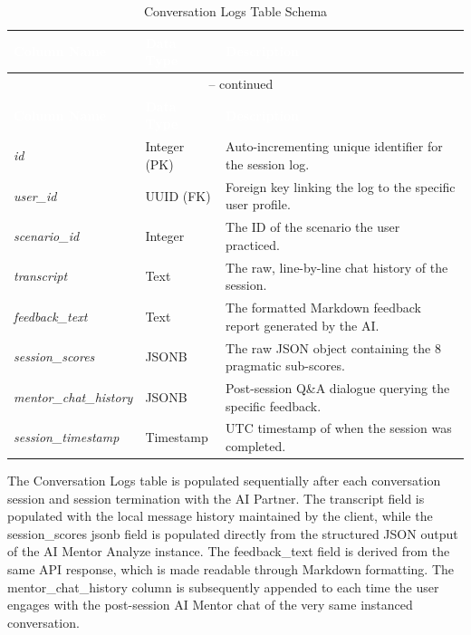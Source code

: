 \begin{longtable}{p{3.5cm} p{2.5cm} p{8cm}}
\caption{Conversation Logs Table Schema}
\label{tab:conversation_logs} \\

\rowcolor{headerblue}
\textcolor{white}{\textbf{Column Name}} &
\textcolor{white}{\textbf{Data Type}} &
\textcolor{white}{\textbf{Description}} \\
\endfirsthead
\multicolumn{3}{c}{\tablename\ \thetable{} -- continued} \\
\rowcolor{headerblue}
\textcolor{white}{\textbf{Column Name}} &
\textcolor{white}{\textbf{Data Type}} &
\textcolor{white}{\textbf{Description}} \\
\endhead

\midrule
\textit{id} & Integer (PK) & Auto-incrementing unique identifier for the session log. \\
\midrule
\textit{user\_id} & UUID (FK) & Foreign key linking the log to the specific user profile. \\
\midrule
\textit{scenario\_id} & Integer & The ID of the scenario the user practiced. \\
\midrule
\textit{transcript} & Text & The raw, line-by-line chat history of the session. \\
\midrule
\textit{feedback\_text} & Text & The formatted Markdown feedback report generated by the AI. \\
\midrule
\textit{session\_scores} & JSONB & The raw JSON object containing the 8 pragmatic sub-scores. \\
\midrule
\textit{mentor\_chat\_history} & JSONB & Post-session Q\&A dialogue querying the specific feedback. \\
\midrule
\textit{session\_timestamp} & Timestamp & UTC timestamp of when the session was completed. \\
\bottomrule
\end{longtable}

The Conversation Logs table is populated sequentially after each conversation session and session termination with the AI Partner. The transcript field
is populated with the local message history maintained by the client, while the session\_scores jsonb field is populated directly from the structured JSON output
of the AI Mentor Analyze instance. The feedback\_text field is derived from the same API response, which is made readable through Markdown formatting. The mentor\_chat\_history
column is subsequently appended to each time the user engages with the post-session AI Mentor chat of the very same instanced conversation.

